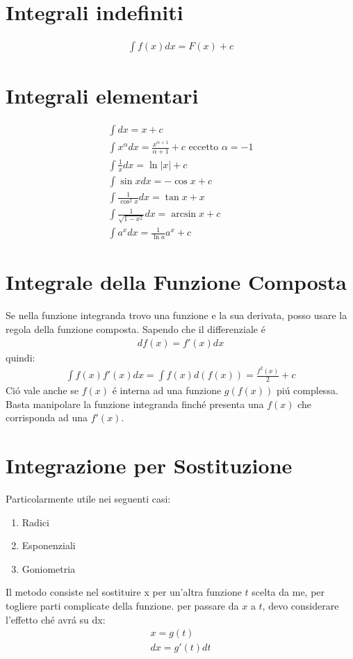 \documentclass{article}
\title{\jobname}
\author{Eugenio Animali}
\begin{document}
\maketitle

\section{Integrali indefiniti}

\begin{gather*}
    \int f(x)dx = F(x) + c
\end{gather*}
\section{Integrali elementari}
\begin{gather*}
    \int dx = x + c\\
    \int x^\alpha dx = \frac{x^{\alpha + 1}}{\alpha + 1} + c \text{ eccetto } \alpha = - 1\\
    \int \frac{1}{x} dx = \ln |x| + c\\
    \int \sin x dx = - \cos x + c\\
    \int \frac{1}{\cos^2 x}dx = \tan x + x\\
    \int \frac{1}{\sqrt{1 - x^2}} dx = \arcsin x + c\\
	\int a^x dx = \frac{1}{\ln a}a^x + c
\end{gather*}

\section{Integrale della Funzione Composta}
Se nella funzione integranda trovo una funzione e la sua derivata, posso usare la regola della funzione composta.
Sapendo che il differenziale é
\begin{gather*}
    df(x) = f'(x) dx
\end{gather*}
quindi:
\begin{gather*}
    \int f(x) f'(x) dx = \int f(x) d(f(x)) = \frac{f^2(x)}{2} + c
\end{gather*}
Ció vale anche se $f(x)$ é interna ad una funzione $g(f(x))$ piú complessa. Basta manipolare la funzione integranda finché presenta una $f(x)$ che corrisponda ad una $f'(x)$.
\section{Integrazione per Sostituzione}
Particolarmente utile nei seguenti casi:
\begin{enumerate}
    \item Radici
    \item Esponenziali
    \item Goniometria
\end{enumerate}
Il metodo consiste nel sostituire x per un'altra funzione $t$ scelta da me, per togliere parti complicate della funzione. per passare da $x$ a $t$, devo considerare l'effetto ché avrá su dx:
\begin{gather*}
    x = g(t)\\
    dx = g'(t)dt
\end{gather*}
\end{document}
